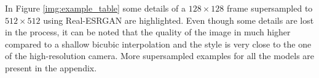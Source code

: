 In Figure \ref{img:example_table} some details of a \(128\times128\) frame supersampled to \(512\times512\) using Real-ESRGAN are highlighted. Even though some details are lost in the process, it can be noted that the quality of the image in much higher compared to a shallow bicubic interpolation and the style is very close to the one of the high-resolution camera. More supersampled examples for all the models are present in the appendix.
